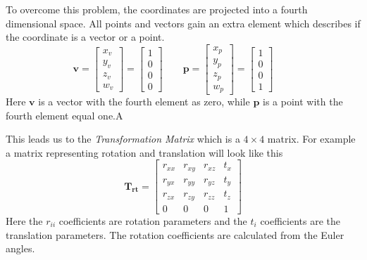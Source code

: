 To overcome this problem, the coordinates are projected into a fourth dimensional space.
All points and vectors gain an extra element which describes if the coordinate is a vector
or a point. 
\begin{equation}
        \mathbf{v} = \left[ \begin{array}{c}
                                    x_v \\
                                    y_v \\
                                    z_v \\
                                    w_v  \end{array} \right]  =
                     \left[ \begin{array}{c}
                                    1 \\
                                    0 \\
                                    0 \\
                                    0  \end{array} \right] \quad \quad
        \mathbf{p} = \left[ \begin{array}{c}
                                    x_p \\
                                    y_p \\
                                    z_p \\
                                    w_p  \end{array} \right]  =
                     \left[ \begin{array}{c}
                                    1 \\
                                    0 \\
                                    0 \\
                                    1  \end{array} \right] \quad \quad
\end{equation}
Here $\mathbf{v}$ is a vector with the fourth element as zero, while $\mathbf{p}$ is a
point with the fourth element equal one.A

This leads us to the \emph{Transformation Matrix} which is a $4 \times 4$ matrix. For
example a matrix representing rotation and translation will look like this
\begin{equation}
    \label{chap2:eq-TransformationMatrix}
    \mathbf{T_{rt}} = \left [ \begin{array}{cccc}
                                r_{xx} & r_{xy} & r_{xz} & t_x \\
                                r_{yx} & r_{yy} & r_{yz} & t_y \\
                                r_{zx} & r_{zy} & r_{zz} & t_z \\
                                0  & 0  & 0  & 1  \end{array} \right]
\end{equation}
Here the $r_{ii}$ coefficients are rotation parameters and the $t_i$ coefficients are the
translation parameters. The rotation coefficients are calculated from the Euler angles.

